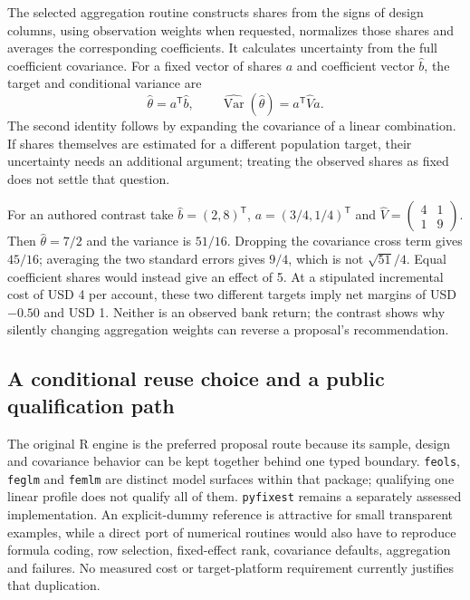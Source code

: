 The selected aggregation routine constructs shares from the signs of design
columns, using observation weights when requested, normalizes those shares
and averages the corresponding coefficients. It calculates uncertainty from
the full coefficient covariance. For a fixed vector of shares $a$ and
coefficient vector $\widehat b$, the target and conditional variance are
\begin{equation}
 \widehat\theta=a^{\mathsf T}\widehat b,\qquad
 \widehat{\operatorname{Var}}(\widehat\theta)=a^{\mathsf T}\widehat V a.
 \label{exec20:fx-aggregate}
\end{equation}
The second identity follows by expanding the covariance of a linear
combination. If shares themselves are estimated for a different population
target, their uncertainty needs an additional argument; treating the observed
shares as fixed does not settle that question.~\citep{exec20_fixest_source}

For an authored contrast take $\widehat b=(2,8)^{\mathsf T}$,
$a=(3/4,1/4)^{\mathsf T}$ and
$\widehat V=\left(\begin{smallmatrix}4&1\\1&9\end{smallmatrix}\right)$.
Then $\widehat\theta=7/2$ and the variance is $51/16$. Dropping the covariance
cross term gives $45/16$; averaging the two standard errors gives $9/4$,
which is not $\sqrt{51}/4$. Equal coefficient shares would instead give an
effect of 5. At a stipulated incremental cost of USD 4 per account, these two
different targets imply net margins of USD $-0.50$ and USD 1. Neither is an
observed bank return; the contrast shows why silently changing aggregation
weights can reverse a proposal's recommendation.~\citep{exec20_fixest_reference}

\subsection{A conditional reuse choice and a public qualification path}
\label{exec20:fx-choice}
The original R engine is the preferred proposal route because its sample,
design and covariance behavior can be kept together behind one typed boundary.
\texttt{feols}, \texttt{feglm} and \texttt{femlm} are distinct model surfaces
within that package; qualifying one linear profile does not qualify all of
them. \texttt{pyfixest} remains a separately assessed implementation.
An explicit-dummy reference is attractive for small transparent examples,
while a direct port of numerical routines would also have to reproduce
formula coding, row selection, fixed-effect rank, covariance defaults,
aggregation and failures. No measured cost or target-platform requirement
currently justifies that duplication.~\citep{exec20_fixest_source,exec20_fixest_reference}


